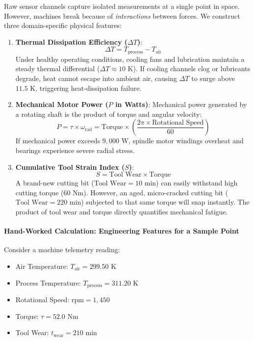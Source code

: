 Raw sensor channels capture isolated measurements at a single point in space. However, machines break because of \textit{interactions} between forces. We construct three domain-specific physical features:

\begin{enumerate}
    \item \textbf{Thermal Dissipation Efficiency ($\Delta T$)}:
    \begin{equation}
    \Delta T = T_{\text{process}} - T_{\text{air}}\label{eq:delta_t}
    \end{equation}
    Under healthy operating conditions, cooling fans and lubrication maintain a steady thermal differential ($\Delta T \approx 10\text{ K}$). If cooling channels clog or lubricants degrade, heat cannot escape into ambient air, causing $\Delta T$ to surge above $11.5\text{ K}$, triggering heat-dissipation failure.

    \item \textbf{Mechanical Motor Power ($P$ in Watts)}:
    Mechanical power generated by a rotating shaft is the product of torque and angular velocity:
    \begin{equation}
    P = \tau \times \omega_{\text{rad}} = \text{Torque} \times \left(\frac{2\pi \times \text{Rotational Speed}}{60}\right)\label{eq:power_calc}
    \end{equation}
    If mechanical power exceeds $9{,}000\text{ W}$, spindle motor windings overheat and bearings experience severe radial stress.

    \item \textbf{Cumulative Tool Strain Index ($S$)}:
    \begin{equation}
    S = \text{Tool Wear} \times \text{Torque}\label{eq:strain_index}
    \end{equation}
    A brand-new cutting bit ($\text{Tool Wear} = 10\text{ min}$) can easily withstand high cutting torque ($60\text{ Nm}$). However, an aged, micro-cracked cutting bit ($\text{Tool Wear} = 220\text{ min}$) subjected to that same torque will snap instantly. The product of tool wear and torque directly quantifies mechanical fatigue.
\end{enumerate}

\paragraph{Hand-Worked Calculation: Engineering Features for a Sample Point}
Consider a machine telemetry reading:
\begin{itemize}
    \item Air Temperature: $T_{\text{air}} = 299.50\text{ K}$
    \item Process Temperature: $T_{\text{process}} = 311.20\text{ K}$
    \item Rotational Speed: $\text{rpm} = 1{,}450$
    \item Torque: $\tau = 52.0\text{ Nm}$
    \item Tool Wear: $t_{\text{wear}} = 210\text{ min}$
\end{itemize}

